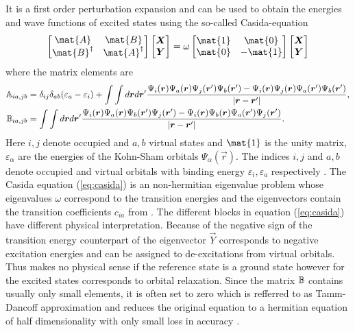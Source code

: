 It is a first order perturbation expansion and can be used to obtain the energies and wave functions of excited states using the so-called Casida-equation \cite{casida}
\begin{equation} \label{eq:casida}
\begin{bmatrix} \mat{A} & \mat{B} \\ \mat{B}^\dagger & \mat{A}^\dagger\end{bmatrix}
\begin{bmatrix} \vec{X} \\ \vec{Y} \end{bmatrix} =
\omega \begin{bmatrix} \mat{1} & \mat{0} \\ \mat{0} & -\mat{1}\end{bmatrix}
\begin{bmatrix} \vec{X} \\ \vec{Y} \end{bmatrix}
\end{equation}
where the matrix elements are
\begin{align}
\mathbb{A}_{ia,jb}& =\delta_{ij}\delta_{ab}(\varepsilon_a-\varepsilon_i)+ 
\int \int d\bm{r} d\bm{r}'\frac{ \Psi_i(\bm{r}) \Psi_a(\bm{r})  \Psi_j(\bm{r}') \Psi_b(\bm{r}')- 
\Psi_i(\bm{r}) \Psi_j(\bm{r}) \Psi_a(\bm{r}') \Psi_b(\bm{r}')}{|\bm{r}-\bm{r}'|} ,\\
\mathbb{B}_{ia,jb}& = \int \int d\bm{r} d\bm{r}'\frac{\Psi_i(\bm{r}) \Psi_a(\bm{r})  \Psi_b(\bm{r}') \Psi_j(\bm{r}')- 
\Psi_i(\bm{r}) \Psi_b(\bm{r})  \Psi_a(\bm{r}') \Psi_j(\bm{r}')}{|\bm{r}-\bm{r}'|}.
\end{align}
Here $i,j$ denote occupied and $a,b$ virtual states and $\mat{1}$ is the unity matrix, $\varepsilon_\alpha$ are the energies of the Kohn-Sham orbitals $\Psi_\alpha(\vec{r})$.
The indices $i,j$ and $a,b$ denote occupied and virtual orbitals with binding energy $\varepsilon_i, \varepsilon_a$ respectively \cite{dreuw}.
The Casida equation (\ref{eq:casida}) is an non-hermitian eigenvalue problem whose eigenvalues $\omega$ correspond to the transition energies and the eigenvectors contain the transition coefficients $c_{ia}$ from .
The different blocks in equation (\ref{eq:casida}) have different physical interpretation.
Because of the negative sign of the transition energy counterpart of the eigenvector $\vec{Y}$ corresponds to negative excitation energies and can be assigned to de-excitations from virtual orbitals.
Thus makes no physical sense if the reference state is a ground state \cite{dreuw} however for the excited states corresponds to orbital relaxation.
Since the matrix $\mathbb{B}$ contains usually only small elements, it is often set to zero which is refferred to as Tamm-Dancoff approximation and reduces the original equation to a hermitian equation of half dimensionality with only small loss in accuracy \cite{casida}.

